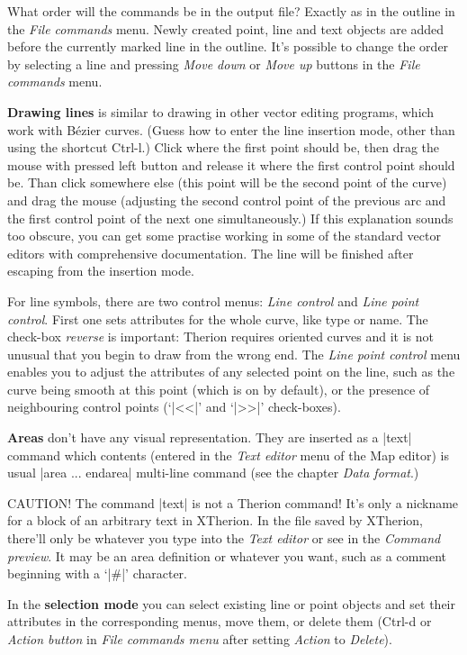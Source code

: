 What order will the commands be in the output file? Exactly as in the 
outline in the {\it File commands} menu. Newly created point, line and text objects 
are added before the currently marked line in the outline. It's possible to 
change the order by selecting a line and pressing {\it Move down} or 
{\it Move up} buttons in the {\it File commands} menu.

{\bf Drawing lines} is similar to drawing in other 
vector editing programs, which work with B\'ezier curves. 
(Guess how to enter the line insertion mode, other than 
using the shortcut Ctrl-l.) Click where the first point should be, then drag the 
mouse with pressed left button and release it where the first control point 
should be. Than click somewhere else (this point will be the second point of 
the curve) and drag the mouse (adjusting the second control point of the 
previous arc and the first control point of the next one simultaneously.) If 
this explanation sounds too obscure, you can 
get some practise working in some of the standard vector editors with 
comprehensive documentation. The line will be finished after escaping from the 
insertion mode.

For line symbols, there are two control menus: {\it Line control} and {\it Line 
point control}. First one sets attributes for the whole curve, like type or
name. The check-box {\it reverse} is important: Therion requires oriented 
curves and it is not unusual that you begin to draw from the wrong end.
The {\it Line point control} menu enables you to adjust the attributes of any selected 
point on the line, such as the curve being smooth at this point (which is on 
by default), or the presence of neighbouring control points (`|<<|' and `|>>|' 
check-boxes).

{\bf Areas} don't have any visual representation. They are inserted as a |text| 
command which contents (entered in the {\it Text editor} menu of the Map editor) 
is usual |area ... endarea| multi-line command (see the chapter {\it Data 
format}.) 

CAUTION! The command |text| is not a Therion command! It's only a nickname for a 
block of an arbitrary text in 
XTherion. In the file saved by XTherion, there'll only be 
whatever you type into the {\it Text editor} or see in the {\it Command preview}.
It may be an area definition or whatever you want, such as a comment beginning 
with a `|#|' character.

In the {\bf selection mode} you can select existing line or point objects and  
set their attributes in the corresponding menus, move them, or delete them (Ctrl-d or 
{\it Action button} in {\it File commands menu} after setting {\it Action} to 
{\it Delete}).

